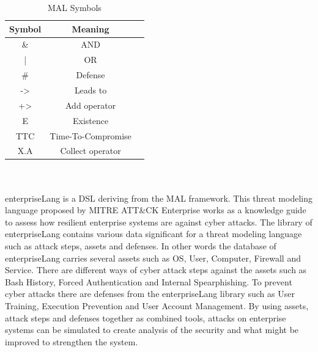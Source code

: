 \documentclass[english]{kththesis}
\begin{document}
\begin{table}[!ht]
  \begin{center}
    \caption{MAL Symbols}
    \label{malsymbols}
    \begin{tabular}{|c|c|c|}
    \hline
      \textbf{Symbol} & \textbf{Meaning}\\
      \hline
      \& & AND\\
      | & OR\\
      \# & Defense\\
      -> & Leads to\\
      +> & Add operator\\
      E & Existence\\
      TTC & Time-To-Compromise\\
      X.A & Collect operator\\
          \hline
    \end{tabular}
  \end{center}
\end{table}

\\\\
\noindent enterpriseLang is a \gls{DSL} deriving from the \gls{MAL} framework. This threat modeling language proposed by MITRE ATT\&CK Enterprise works as a knowledge guide to assess how resilient enterprise systems are against cyber attacks. The library of enterpriseLang contains various data significant for a threat modeling language such as attack steps, assets and defenses. In other words the database of enterpriseLang carries several assets such as \gls{OS}, User, Computer, Firewall and Service. There are different ways of cyber attack steps against the assets such as Bash History, Forced Authentication and Internal Spearphishing. To prevent cyber attacks there are defenses from the enterpriseLang library such as User Training, Execution Prevention and User Account Management. By using assets, attack steps and defenses together as combined tools, attacks on enterprise systems can be simulated to create analysis of the security and what might be improved to strengthen the system\cite{johnson2018mal}.\\

\end{document}
